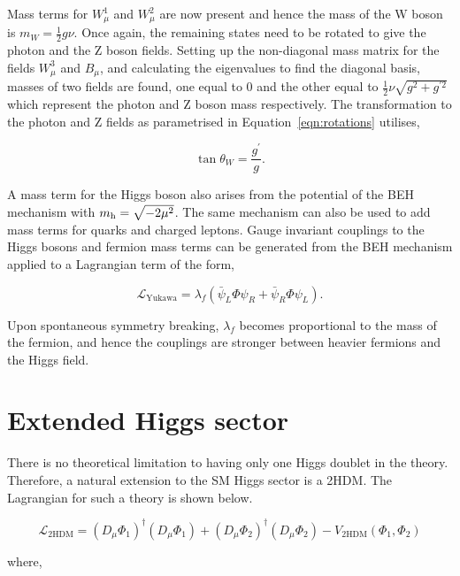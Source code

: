 Mass terms for $W_{\mu}^{1}$ and $W_{\mu}^{2}$ are now present and hence the mass of the W boson is $m_W = \frac{1}{2}g\nu$.
Once again, the remaining states need to be rotated to give the photon and the Z boson fields.
Setting up the non-diagonal mass matrix for the fields $W_{\mu}^{3}$ and $B_{\mu}$, and calculating the eigenvalues to find the diagonal basis, masses of two fields are found, one equal to 0 and the other equal to $\frac{1}{2} \nu \sqrt{g^2 + g^{\prime 2}}$ which represent the photon and Z boson mass respectively.
The transformation to the photon and Z fields as parametrised in Equation~\ref{eqn:rotations} utilises,

\begin{equation}
\tan\theta_W = \frac{g^{\prime}}{g}.
\end{equation}

A mass term for the Higgs boson also arises from the potential of the \ac{BEH} mechanism with $m_{{\text{h}}} = \sqrt{-2\mu^2}$. 
The same mechanism can also be used to add mass terms for quarks and charged leptons.
Gauge invariant couplings to the Higgs bosons and fermion mass terms can be generated from the \ac{BEH} mechanism applied to a Lagrangian term of the form,

\begin{equation}
\mathcal{L}_{\text{Yukawa}} = \lambda_f (\bar{\psi}_{L}\Phi\psi_{R} + \bar{\psi}_{R}\Phi\psi_{L}).
\end{equation}

Upon spontaneous symmetry breaking, $\lambda_{f}$ becomes proportional to the mass of the fermion, and hence the couplings are stronger between heavier fermions and the Higgs field.

\section{Extended Higgs sector}

There is no theoretical limitation to having only one Higgs doublet in the theory.
Therefore, a natural extension to the \ac{SM} Higgs sector is a \ac{2HDM}.
The Lagrangian for such a theory is shown below.

\begin{equation}
\mathcal{L}_{\text{2HDM}} = (D_\mu \Phi_1)^{\dagger} (D_\mu \Phi_1) + (D_\mu \Phi_2)^{\dagger} (D_\mu \Phi_2) - V_{\text{2HDM}}(\Phi_1 ,\Phi_2)
\end{equation}

where,

